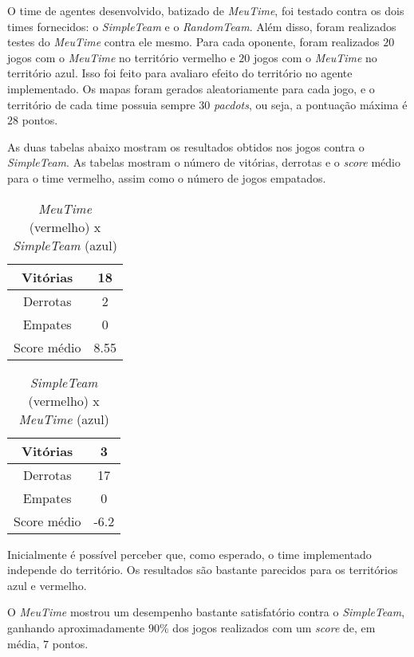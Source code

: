\documentclass[a4paper,12pt]{article}
\begin{document}
O time de agentes desenvolvido, batizado de \textit{MeuTime}, foi testado contra os dois
times fornecidos: o \textit{SimpleTeam} e o \textit{RandomTeam}. Além disso, foram
realizados testes do \textit{MeuTime} contra ele mesmo. Para cada oponente, foram realizados
$20$ jogos com o \textit{MeuTime} no território vermelho e $20$ jogos com o \textit{MeuTime}
no território azul. Isso foi feito para avaliaro efeito do território no agente implementado.
Os mapas foram gerados aleatoriamente para cada jogo, e o território de cada time
possuia sempre $30$ \textit{pacdots}, ou seja, a pontuação máxima é $28$ pontos.

As duas tabelas abaixo mostram os resultados obtidos nos jogos contra o \textit{SimpleTeam}.
As tabelas mostram o número de vitórias, derrotas e o \textit{score} médio para o time vermelho,
assim como o número de jogos empatados.

\begin{table}[htb!]
    {\centering
    \begin{tabular}{|c|c|} \hline
    Vitórias     & 18   \\ \hline
    Derrotas     & 2    \\ \hline
    Empates      & 0    \\ \hline
    Score médio  & 8.55 \\ \hline
    \end{tabular}
    \caption{\textit{MeuTime} (vermelho) x \textit{SimpleTeam} (azul)}
    }
\end{table}

\begin{table}[htb!]
    {\centering
    \begin{tabular}{|c|c|} \hline
    Vitórias     & 3    \\ \hline
    Derrotas     & 17   \\ \hline
    Empates      & 0    \\ \hline
    Score médio  & -6.2 \\ \hline
    \end{tabular}
    \caption{\textit{SimpleTeam} (vermelho) x \textit{MeuTime} (azul)}
    }
\end{table}

Inicialmente é possível perceber que, como esperado, o time implementado independe do
território. Os resultados são bastante parecidos para os territórios azul e vermelho.

O \textit{MeuTime} mostrou um desempenho bastante satisfatório contra o \textit{SimpleTeam},
ganhando aproximadamente $90\%$ dos jogos realizados com um \textit{score} de, em média,
$7$ pontos.
\end{document}
